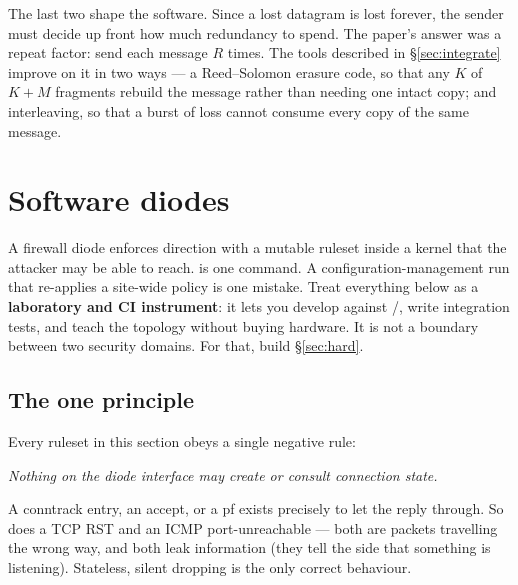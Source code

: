 \documentclass[11pt,a4paper]{article}
\renewcommand{\amp}{\prog{od\_sender}}
\renewcommand{\deamp}{\prog{od\_receiver}}
\begin{document}
The last two shape the software. Since a lost datagram is lost forever, the
sender must decide up front how much redundancy to spend. The paper's answer
was a repeat factor: send each message $R$ times. The tools described in
\S\ref{sec:integrate} improve on it in two ways --- a Reed--Solomon erasure
code, so that any $K$ of $K+M$ fragments rebuild the message rather than
needing one intact copy; and interleaving, so that a burst of loss cannot
consume every copy of the same message.

\section{Software diodes}
\label{sec:soft}

\begin{labbox}
A firewall diode enforces direction with a mutable ruleset inside a kernel
that the attacker may be able to reach.  is one
command. A configuration-management run that re-applies a site-wide policy is
one mistake. Treat everything below as a \textbf{laboratory and CI
instrument}: it lets you develop against \amp{}/\deamp{}, write integration
tests, and teach the topology without buying hardware. It is not a boundary
between two security domains. For that, build \S\ref{sec:hard}.
\end{labbox}

\subsection{The one principle}

Every ruleset in this section obeys a single negative rule:

\begin{center}
\emph{Nothing on the diode interface may create or consult connection state.}
\end{center}

A conntrack entry, an  accept, or a pf
 exists precisely to let the reply through. So does a TCP RST
and an ICMP port-unreachable --- both are packets travelling the wrong way,
and both leak information (they tell the \dstside{} side that something is
listening). Stateless, silent dropping is the only correct behaviour.
\end{document}
